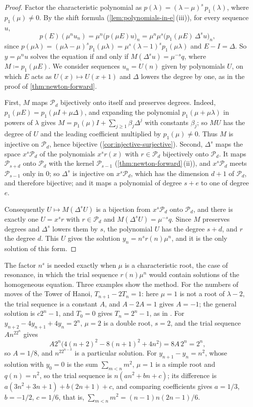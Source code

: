 \begin{proof}
Factor the characteristic polynomial as $p(\lambda)=(\lambda-\mu)^s\,p_1(\lambda)$, where $p_1(\mu)\ne0$. By the shift formula (\cref{lem:polynomials-in-e}\,(iii)), for every sequence $u$,
\[
p(E)(\mu^nu_n)=\mu^n\bigl(p(\mu E)u\bigr)_n=\mu^n\mu^s\bigl(p_1(\mu E)\,\Delta^su\bigr)_n ,
\]
since $p(\mu\lambda)=(\mu\lambda-\mu)^sp_1(\mu\lambda)=\mu^s(\lambda-1)^sp_1(\mu\lambda)$ and $E-I=\Delta$. So $y=\mu^nu$ solves the equation if and only if $M(\Delta^su)=\mu^{-s}q$, where $M\coloneqq p_1(\mu E)$. We consider sequences $u_n=U(n)$ given by polynomials $U$, on which $E$ acts as $U(x)\mapsto U(x+1)$ and $\Delta$ lowers the degree by one, as in the proof of \cref{thm:newton-forward}.

First, $M$ maps $\mathcal P_d$ bijectively onto itself and preserves degrees. Indeed, $p_1(\mu E)=p_1(\mu I+\mu\Delta)$, and expanding the polynomial $p_1(\mu+\mu\lambda)$ in powers of $\lambda$ gives $M=p_1(\mu)I+\sum_{j\ge1}\beta_j\Delta^j$ with constants $\beta_j$; so $MU$ has the degree of $U$ and the leading coefficient multiplied by $p_1(\mu)\ne0$. Thus $M$ is injective on $\mathcal P_d$, hence bijective (\cref{cor:injective-surjective}). Second, $\Delta^s$ maps the space $x^s\mathcal P_d$ of the polynomials $x^sr(x)$ with $r\in\mathcal P_d$ bijectively onto $\mathcal P_d$. It maps $\mathcal P_{s+d}$ onto $\mathcal P_d$ with the kernel $\mathcal P_{s-1}$ (\cref{thm:newton-forward}\,(ii)), and $x^s\mathcal P_d$ meets $\mathcal P_{s-1}$ only in $0$; so $\Delta^s$ is injective on $x^s\mathcal P_d$, which has the dimension $d+1$ of $\mathcal P_d$, and therefore bijective; and it maps a polynomial of degree $s+e$ to one of degree $e$.

Consequently $U\mapsto M(\Delta^sU)$ is a bijection from $x^s\mathcal P_d$ onto $\mathcal P_d$, and there is exactly one $U=x^sr$ with $r\in\mathcal P_d$ and $M(\Delta^sU)=\mu^{-s}q$. Since $M$ preserves degrees and $\Delta^s$ lowers them by $s$, the polynomial $U$ has the degree $s+d$, and $r$ the degree $d$. This $U$ gives the solution $y_n=n^sr(n)\mu^n$, and it is the only solution of this form.
\end{proof}

The factor $n^s$ is needed exactly when $\mu$ is a characteristic root, the case of resonance, in which the trial sequence $r(n)\mu^n$ would contain solutions of the homogeneous equation. Three examples show the method. For the numbers of moves of the Tower of Hanoi, $T_{n+1}-2T_n=1$: here $\mu=1$ is not a root of $\lambda-2$, the trial sequence is a constant $A$, and $A-2A=1$ gives $A=-1$; the general solution is $c2^n-1$, and $T_0=0$ gives $T_n=2^n-1$, as in . For $y_{n+2}-4y_{n+1}+4y_n=2^n$, $\mu=2$ is a double root, $s=2$, and the trial sequence $An^22^n$ gives
\[
A2^n\bigl(4(n+2)^2-8(n+1)^2+4n^2\bigr)=8A\,2^n=2^n ,
\]
so $A=1/8$, and $n^22^{n-3}$ is a particular solution. For $y_{n+1}-y_n=n^2$, whose solution with $y_0=0$ is the sum $\sum_{m<n}m^2$, $\mu=1$ is a simple root and $q(n)=n^2$, so the trial sequence is $n(an^2+bn+c)$; its difference is $a(3n^2+3n+1)+b(2n+1)+c$, and comparing coefficients gives $a=1/3$, $b=-1/2$, $c=1/6$, that is, $\sum_{m<n}m^2=(n-1)n(2n-1)/6$.

